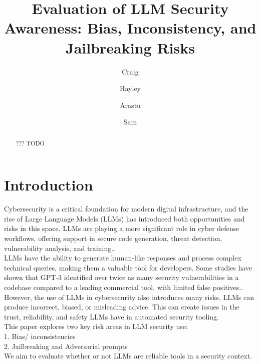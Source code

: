 \documentclass[sigconf]{acmart}
\title{Evaluation of LLM Security Awareness: Bias, Inconsistency, and Jailbreaking Risks}
\author{Craig}
\affiliation{%
  \institution{University of Sydney}
  \city{Sydney}
  \country{Australia}}
\author{Hayley}
\affiliation{%
  \institution{University of Sydney}
  \city{Sydney}
  \country{Australia}}
\author{Arastu}
\affiliation{%
  \institution{University of Sydney}
  \city{Sydney}
  \country{Australia}}
\author{Sam}
\affiliation{%
  \institution{University of Sydney}
  \city{Sydney}
  \country{Australia}}
\begin{document}
\begin{abstract}
\item ??? TODO
\end{abstract}

\maketitle

\section{Introduction}
Cybersecurity is a critical foundation for modern digital infrastructure, and the rise of Large Language Models (LLMs) has introduced both opportunities and risks in this space. LLMs are playing a more significant role in cyber defense workflows, offering support in secure code generation, threat detection, vulnerability analysis, and training.\cite{zhang2025}.
\\
LLMs have the ability to generate human-like responses and process complex technical queries, making them a valuable tool for developers. Some studies have shown that GPT-3 identified over twice as many security vulnerabilities in a codebase compared to a leading commercial tool, with limited false positives.\cite{Yao23}.
\\
However, the use of LLMs in cybersecurity also introduces many risks. LLMs can produce incorrect, biased, or misleading advice. \cite{OSF24} This can create issues in the trust, reliability, and safety LLMs have in automated security tooling.
\\
This paper explores two key risk areas in LLM security use:
\\
1. Bias/ inconsistencies
\\
2. Jailbreaking and Adversarial prompts
\\
We aim to evaluate whether or not LLMs are reliable tools in a security context.
\end{document}
